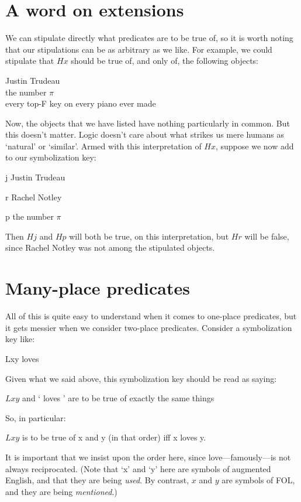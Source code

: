 \section{A word on extensions}
We can stipulate directly what predicates are to be true of, so it is worth noting that our stipulations can be as arbitrary as we like. For example, we could stipulate that $Hx$ should be true of, and only of, the following objects:
	\begin{center}
		Justin Trudeau\\
		the number $\pi$\\
		every top-F key on every piano ever made
	\end{center}
Now, the objects that we have listed have nothing particularly in common. But this doesn't matter. Logic doesn't care about what strikes us mere humans as `natural' or `similar'. Armed with this interpretation of $Hx$, suppose we now add to our symbolization key:
	\begin{ekey}
		\item[j] Justin Trudeau
		\item[r] Rachel Notley
		\item[p] the number $\pi$
	\end{ekey}
Then $Hj$ and $Hp$ will both be true, on this interpretation, but $Hr$ will be false, since Rachel Notley was not among the stipulated objects.



\section{Many-place predicates}
All of this is quite easy to understand when it comes to one-place predicates, but it gets messier when we consider two-place predicates. Consider a symbolization key like:
	\begin{ekey}
		\item[Lxy]  loves 
	\end{ekey}
Given what we said above, this symbolization key should be read as saying:
	\begin{earg}
		\item[\textbullet] $Lxy$ and ` loves ' are to be true of exactly the same things
	\end{earg}
So, in particular:
	\begin{earg}
		\item[\textbullet] $Lxy$ is to be true of x and y (in that order) iff x loves y.
	\end{earg}
It is important that we insist upon the order here, since love---famously---is not always reciprocated. (Note that `x' and `y' here are symbols of augmented English, and that they are being \emph{used}. By contrast, $x$ and $y$ are symbols of FOL, and they are being \emph{mentioned}.)

